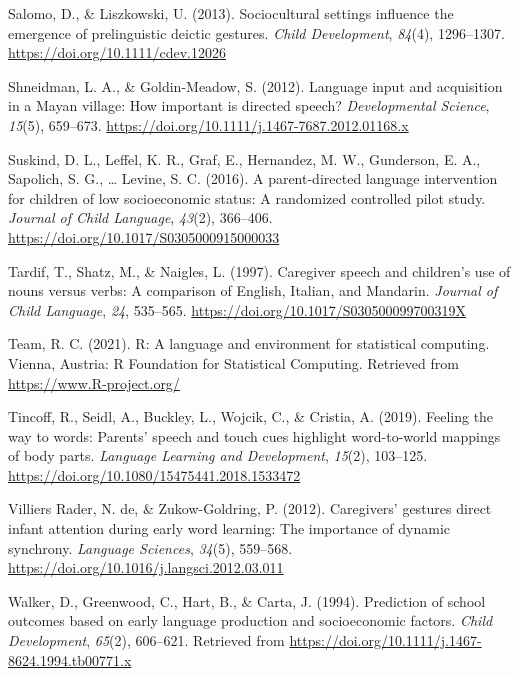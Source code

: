 \documentclass[
  english,
  man,floatsintext]{apa6}
\begin{document}
\leavevmode\hypertarget{ref-salomo_sociocultural_2013}{}%
Salomo, D., \& Liszkowski, U. (2013). Sociocultural settings influence the emergence of prelinguistic deictic gestures. \emph{Child Development}, \emph{84}(4), 1296--1307. \url{https://doi.org/10.1111/cdev.12026}

\leavevmode\hypertarget{ref-shneidman_language_2012}{}%
Shneidman, L. A., \& Goldin-Meadow, S. (2012). Language input and acquisition in a Mayan village: How important is directed speech? \emph{Developmental Science}, \emph{15}(5), 659--673. \url{https://doi.org/10.1111/j.1467-7687.2012.01168.x}

\leavevmode\hypertarget{ref-suskind_parent-directed_2016}{}%
Suskind, D. L., Leffel, K. R., Graf, E., Hernandez, M. W., Gunderson, E. A., Sapolich, S. G., \ldots{} Levine, S. C. (2016). A parent-directed language intervention for children of low socioeconomic status: A randomized controlled pilot study. \emph{Journal of Child Language}, \emph{43}(2), 366--406. \url{https://doi.org/10.1017/S0305000915000033}

\leavevmode\hypertarget{ref-tardif_caregiver_1997}{}%
Tardif, T., Shatz, M., \& Naigles, L. (1997). Caregiver speech and children's use of nouns versus verbs: A comparison of English, Italian, and Mandarin. \emph{Journal of Child Language}, \emph{24}, 535--565. \url{https://doi.org/10.1017/S030500099700319X}

\leavevmode\hypertarget{ref-r_core_team_r_2021}{}%
Team, R. C. (2021). R: A language and environment for statistical computing. Vienna, Austria: R Foundation for Statistical Computing. Retrieved from \url{https://www.R-project.org/}

\leavevmode\hypertarget{ref-tincoff_feeling_2019}{}%
Tincoff, R., Seidl, A., Buckley, L., Wojcik, C., \& Cristia, A. (2019). Feeling the way to words: Parents' speech and touch cues highlight word-to-world mappings of body parts. \emph{Language Learning and Development}, \emph{15}(2), 103--125. \url{https://doi.org/10.1080/15475441.2018.1533472}

\leavevmode\hypertarget{ref-de_villiers_rader_caregivers_2012}{}%
Villiers Rader, N. de, \& Zukow-Goldring, P. (2012). Caregivers' gestures direct infant attention during early word learning: The importance of dynamic synchrony. \emph{Language Sciences}, \emph{34}(5), 559--568. \url{https://doi.org/10.1016/j.langsci.2012.03.011}

\leavevmode\hypertarget{ref-walker_prediction_1994}{}%
Walker, D., Greenwood, C., Hart, B., \& Carta, J. (1994). Prediction of school outcomes based on early language production and socioeconomic factors. \emph{Child Development}, \emph{65}(2), 606--621. Retrieved from \url{https://doi.org/10.1111/j.1467-8624.1994.tb00771.x}
\end{document}

